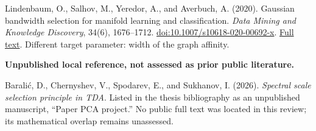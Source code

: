 \documentclass[10pt,a4paper]{article}
\begin{document}
\begin{enumerate}[label={[\arabic*]},start=9,itemsep=8pt]
\item Lindenbaum, O., Salhov, M., Yeredor, A., and Averbuch, A. (2020). Gaussian bandwidth selection for manifold learning and classification. \emph{Data Mining and Knowledge Discovery}, 34(6), 1676--1712. \href{https://doi.org/10.1007/s10618-020-00692-x}{doi:10.1007/s10618-020-00692-x}. \href{https://pmc.ncbi.nlm.nih.gov/articles/PMC7330274/}{Full text}. Different target parameter: width of the graph affinity.
\end{enumerate}
\normalsize
\vfill
\textbf{Unpublished local reference, not assessed as prior public literature.}\par
Barali\'c, D., Chernyshev, V., Spodarev, E., and Sukhanov, I. (2026). \emph{Spectral scale selection principle in TDA}. Listed in the thesis bibliography as an unpublished manuscript, ``Paper PCA project.'' No public full text was located in this review; its mathematical overlap remains unassessed.
\end{document}
